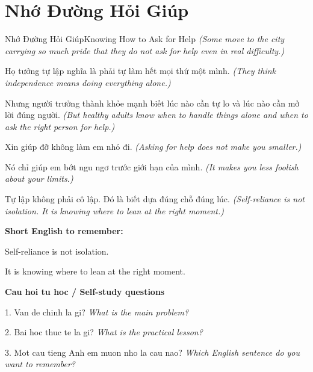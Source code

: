 \section{Nhớ Đường Hỏi Giúp}
\begin{truyen}{Nhớ Đường Hỏi Giúp}{Knowing How to Ask for Help}
\textit{(Some move to the city carrying so much pride that they do not ask for help even in real difficulty.)}

Họ tưởng tự lập nghĩa là phải tự làm hết mọi thứ một mình.
\textit{(They think independence means doing everything alone.)}

Nhưng người trưởng thành khỏe mạnh biết lúc nào cần tự lo và lúc nào cần mở lời đúng người.
\textit{(But healthy adults know when to handle things alone and when to ask the right person for help.)}

Xin giúp đỡ không làm em nhỏ đi.
\textit{(Asking for help does not make you smaller.)}

Nó chỉ giúp em bớt ngu ngơ trước giới hạn của mình.
\textit{(It makes you less foolish about your limits.)}

\end{truyen}

\begin{baihoc}
Tự lập không phải cô lập. Đó là biết dựa đúng chỗ đúng lúc.
\textit{(Self-reliance is not isolation. It is knowing where to lean at the right moment.)}
\end{baihoc}

\begin{ghinhoanh}
\textbf{Short English to remember:}

Self-reliance is not isolation.

It is knowing where to lean at the right moment.

\end{ghinhoanh}

\begin{tuhocnhanh}
\textbf{Cau hoi tu hoc / Self-study questions}

1. Van de chinh la gi? \textit{What is the main problem?}

2. Bai hoc thuc te la gi? \textit{What is the practical lesson?}

3. Mot cau tieng Anh em muon nho la cau nao? \textit{Which English sentence do you want to remember?}
\end{tuhocnhanh}
\ngancach

